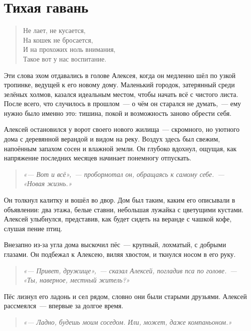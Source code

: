 \documentclass[12pt,a4paper]{book}
\newenvironment{dialogue}{\begin{quote}\itshape}{\end{quote}} %
\begin{document}
\chapter{Тихая гавань}

\begin{verse}
Не лает, не кусается,\\
На кошек не бросается,\\
И на прохожих ноль внимания,\\
Такое вот у нас воспитание.
\end{verse}

Эти слова эхом отдавались в голове Алексея, когда он медленно шёл по узкой тропинке, ведущей к его новому дому. Маленький городок, затерянный среди зелёных холмов, казался идеальным местом, чтобы начать всё с чистого листа. После всего, что случилось в прошлом~--- о чём он старался не думать,~--- ему нужно было именно это: тишина, покой и возможность заново обрести себя.

Алексей остановился у ворот своего нового жилища~--- скромного, но уютного дома с деревянной верандой и видом на реку. Воздух здесь был свежим, напоённым запахом сосен и влажной земли. Он глубоко вдохнул, ощущая, как напряжение последних месяцев начинает понемногу отпускать.

\begin{dialogue}
«--- Вот и всё»,~--- пробормотал он, обращаясь к самому себе.~--- «Новая жизнь.»
\end{dialogue}

Он толкнул калитку и вошёл во двор. Дом был таким, каким его описывали в объявлении: два этажа, белые ставни, небольшая лужайка с цветущими кустами. Алексей улыбнулся, представив, как будет сидеть на веранде с чашкой кофе, слушая пение птиц.

Внезапно из-за угла дома выскочил пёс~--- крупный, лохматый, с добрыми глазами. Он подбежал к Алексею, виляя хвостом, и ткнулся носом в его руку.

\begin{dialogue}
«--- Привет, дружище»,~--- сказал Алексей, погладив пса по голове.~--- «Ты, наверное, местный житель?»
\end{dialogue}

Пёс лизнул его ладонь и сел рядом, словно они были старыми друзьями. Алексей рассмеялся~--- впервые за долгое время.

\begin{dialogue}
«--- Ладно, будешь моим соседом. Или, может, даже компаньоном.»
\end{dialogue}
\end{document}
